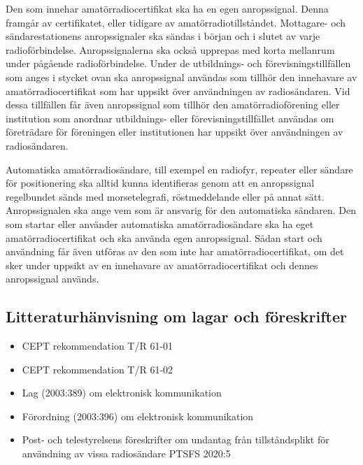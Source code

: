 \newpage %
Den som innehar amatörradiocertifikat ska ha en egen anropssignal.
Denna framgår av certifikatet, eller tidigare av amatörradiotillståndet.
Mottagare- och sändarestationens anropssignaler ska sändas i början och i
slutet av varje radioförbindelse.
Anropssignalerna ska också upprepas med korta mellanrum under pågående
radioförbindelse. Under de utbildnings- och förevisningstillfällen som anges i
stycket ovan ska anropssignal användas som tillhör den innehavare av
amatörradiocertifikat som har uppsikt över användningen av radiosändaren.
Vid dessa tillfällen får även anropssignal som tillhör den amatörradioförening
eller institution som anordnar utbildnings- eller förevisningstillfället
användas om företrädare för föreningen eller institutionen har uppsikt över
användningen av radiosändaren.

Automatiska amatörradiosändare, till exempel en radiofyr, repeater eller
sändare för positionering ska alltid kunna identifieras genom att en
anropssignal regelbundet sänds med morsetelegrafi, röstmeddelande eller
på annat sätt.
Anropssignalen ska ange vem som är ansvarig för den automatiska sändaren.
Den som startar eller använder automatiska amatörradiosändare ska ha eget
amatörradiocertifikat och ska använda egen anropssignal.
Sådan start och användning får även utföras av den som inte har
amatörradiocertifikat, om det sker under uppsikt av en innehavare av
amatörradiocertifikat och dennes anropssignal används.

\subsection{Litteraturhänvisning om lagar och föreskrifter}

\begin{itemize}
\item CEPT rekommendation T/R 61-01 \cite{TR6101}
\item CEPT rekommendation T/R 61-02 \cite{TR6102}
\item Lag (2003:389) om elektronisk kommunikation \cite{SFS2003:389}
\item Förordning (2003:396) om elektronisk kommunikation \cite{SFS2003:396}
\item Post- och telestyrelsens föreskrifter om undantag från tillståndsplikt för
användning av vissa radiosändare PTSFS 2020:5 \cite{PTSFS2020:5}
\end{itemize}
